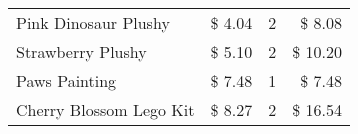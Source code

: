 \begin{table}[H]
\begin{tabular}{l|rrr}
	Pink Dinosaur Plushy    & \$ 4.04                                 & 2                                     & \$ 8.08                                 \\
	Strawberry Plushy       & \$ 5.10                                 & 2                                     & \$ 10.20                                \\
	Paws Painting           & \$ 7.48                                 & 1                                     & \$ 7.48                                 \\
	Cherry Blossom Lego Kit & \$ 8.27                                 & 2                                     & \$ 16.54
	\end{tabular}
	\label{tab:temu}
\end{table}
